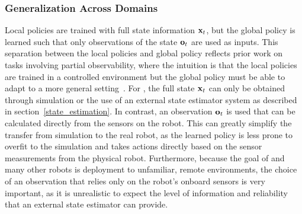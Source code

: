 
\subsubsection{Generalization Across Domains}

Local policies are trained with full state information $\mathbf{x}_t$, but the global policy is learned such that only observations of the state $\mathbf{o}_t$ are used as inputs.
This separation between the local policies and global policy reflects prior work on tasks involving partial observability, where the intuition is that the local policies are trained in a controlled environment but the global policy must be able to adapt to a more general setting~\cite{lfda-eetdv-16}.
For \SB{}, the full state $\mathbf{x}_t$ can only be obtained through simulation or the use of an external state estimator system as described in section~\ref{state_estimation}. 
In contrast, an observation $\mathbf{o}_t$ is used that can be calculated directly from the sensors on the robot.
This can greatly simplify the transfer from simulation to the real robot, as the learned policy is less prone to overfit to the simulation and takes actions directly based on the sensor measurements from the physical robot. 
Furthermore, because the goal of \SB{} and many other robots is deployment to unfamiliar, remote environments, the choice of an observation that relies only on the robot's onboard sensors is very important, as it is unrealistic to expect the level of information and reliability that an external state estimator can provide. 

